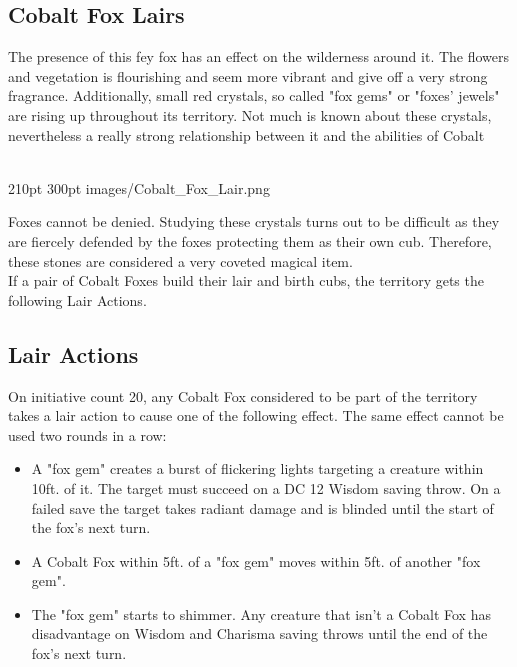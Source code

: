 \documentclass[letterpaper,openany,oneside,twocolumn]{book}
\begin{document}
\subsection*{Cobalt Fox Lairs}
The presence of this fey fox has an effect on the wilderness around it. The flowers and vegetation is flourishing and seem more vibrant and give off a very strong fragrance. Additionally, small red crystals, so called "fox gems" or "foxes' jewels" are rising up throughout its territory. Not much is known about these crystals, nevertheless a really strong relationship between it and the abilities of Cobalt ~~~~~~


\MonsterBannerGraphic%
	{}%
	{210pt}%
	{300pt}%
	{images/Cobalt_Fox_Lair.png}%
	{}%
	
Foxes cannot be denied. Studying these crystals turns out to be difficult as they are fiercely defended by the foxes protecting them as their own cub. Therefore, these stones are considered a very coveted magical item.\\
If a pair of Cobalt Foxes build their lair and birth cubs, the territory gets the following Lair Actions.

\subsection*{Lair Actions}
On initiative count 20, any Cobalt Fox considered to be part of the territory takes a lair action to cause one of the following effect. The same effect cannot be used two rounds in a row:
\begin{itemize}
	\item A "fox gem" creates a burst of flickering lights targeting a creature within 10ft. of it. The target must succeed on a DC 12 Wisdom saving throw. On a failed save the target takes  radiant damage and is blinded until the start of the fox's next turn.
	\item A Cobalt Fox within 5ft. of a "fox gem" moves within 5ft. of another "fox gem".
	\item The "fox gem" starts to shimmer. Any creature that isn't a Cobalt Fox has disadvantage on Wisdom and Charisma saving throws until the end of the fox's next turn.
\end{itemize}
\end{document}
